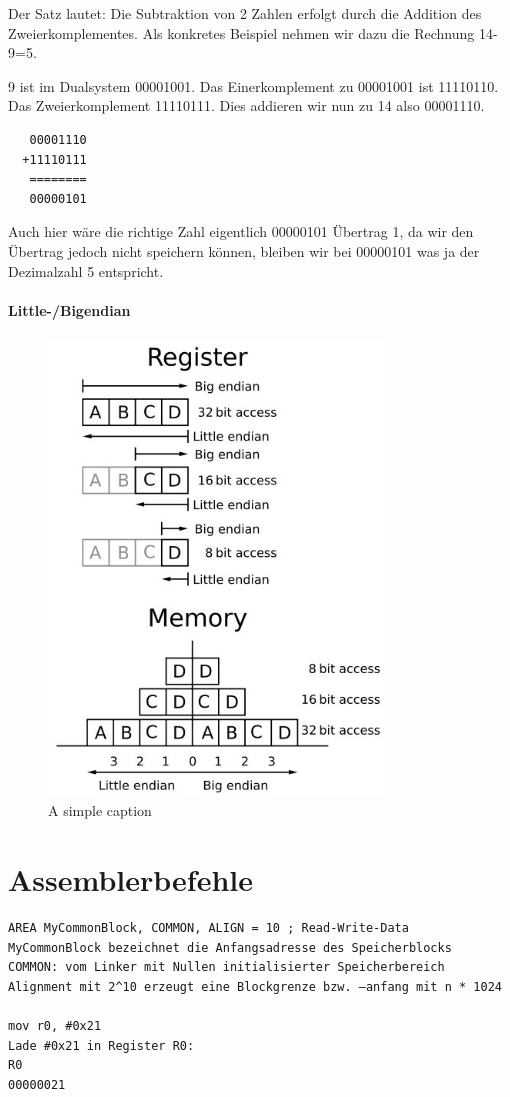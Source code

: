 \documentclass[12pt,a4paper]{scrartcl}
\begin{document}
Der Satz lautet: Die Subtraktion von 2 Zahlen erfolgt durch die Addition des Zweierkomplementes. Als konkretes Beispiel nehmen wir dazu die Rechnung 14-9=5.

9 ist im Dualsystem 00001001.
Das Einerkomplement zu 00001001 ist 11110110.
Das Zweierkomplement 11110111.
Dies addieren wir nun zu 14 also 00001110.

\begin{lstlisting}
   00001110 
  +11110111 
   ========
   00000101
\end{lstlisting}

Auch hier wäre die richtige Zahl eigentlich 00000101 Übertrag 1, da wir den Übertrag jedoch nicht speichern können, bleiben wir bei 00000101 was ja der Dezimalzahl 5 entspricht.

\paragraph{Little-/Bigendian}
\begin{figure}[ht!]
\centering
\includegraphics[width=90mm]{big-endian_und_little-endian.jpg}
\caption{A simple caption \label{overflow}}
\end{figure}

\section*{Assemblerbefehle}
\begin{lstlisting}
AREA MyCommonBlock, COMMON, ALIGN = 10 ; Read-Write-Data
MyCommonBlock bezeichnet die Anfangsadresse des Speicherblocks
COMMON: vom Linker mit Nullen initialisierter Speicherbereich
Alignment mit 2^10 erzeugt eine Blockgrenze bzw. –anfang mit n * 1024

mov r0, #0x21
Lade #0x21 in Register R0:
R0
00000021
\end{lstlisting} 
\end{document}
